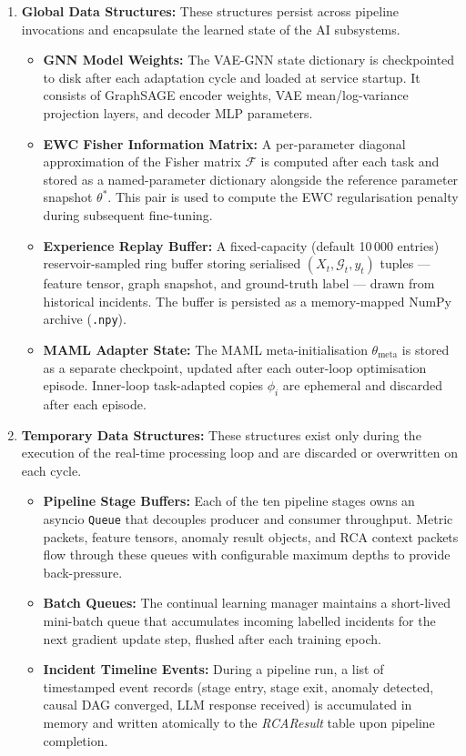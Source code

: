 \begin{enumerate}[label=\Alph*.]
    \item \textbf{Global Data Structures:}
    These structures persist across pipeline invocations and encapsulate the learned state of the AI subsystems.
    \begin{itemize}
        \item \textbf{GNN Model Weights:} The VAE-GNN state dictionary is checkpointed to disk after each adaptation cycle and loaded at service startup. It consists of GraphSAGE encoder weights, VAE mean/log-variance projection layers, and decoder MLP parameters.
        \item \textbf{EWC Fisher Information Matrix:} A per-parameter diagonal approximation of the Fisher matrix $\mathcal{F}$ is computed after each task and stored as a named-parameter dictionary alongside the reference parameter snapshot $\theta^*$. This pair is used to compute the EWC regularisation penalty during subsequent fine-tuning.
        \item \textbf{Experience Replay Buffer:} A fixed-capacity (default 10\,000 entries) reservoir-sampled ring buffer storing serialised $(X_t, \mathcal{G}_t, y_t)$ tuples — feature tensor, graph snapshot, and ground-truth label — drawn from historical incidents. The buffer is persisted as a memory-mapped NumPy archive (\texttt{.npy}).
        \item \textbf{MAML Adapter State:} The MAML meta-initialisation $\theta_{\text{meta}}$ is stored as a separate checkpoint, updated after each outer-loop optimisation episode. Inner-loop task-adapted copies $\phi_i$ are ephemeral and discarded after each episode.
    \end{itemize}

    \item \textbf{Temporary Data Structures:}
    These structures exist only during the execution of the real-time processing loop and are discarded or overwritten on each cycle.
    \begin{itemize}
        \item \textbf{Pipeline Stage Buffers:} Each of the ten pipeline stages owns an asyncio \texttt{Queue} that decouples producer and consumer throughput. Metric packets, feature tensors, anomaly result objects, and RCA context packets flow through these queues with configurable maximum depths to provide back-pressure.
        \item \textbf{Batch Queues:} The continual learning manager maintains a short-lived mini-batch queue that accumulates incoming labelled incidents for the next gradient update step, flushed after each training epoch.
        \item \textbf{Incident Timeline Events:} During a pipeline run, a list of timestamped event records (stage entry, stage exit, anomaly detected, causal DAG converged, LLM response received) is accumulated in memory and written atomically to the \textit{RCAResult} table upon pipeline completion.
    \end{itemize}

\end{enumerate}

